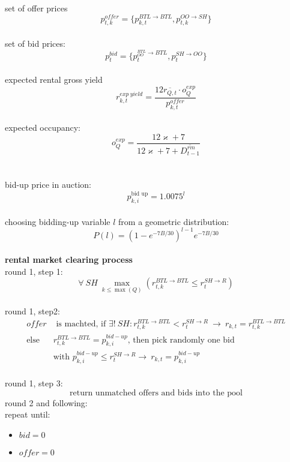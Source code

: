 \documentclass[]{article}
\begin{document}
set of offer prices
\begin{equation}\label{eq:p_offer}
	p^{offer}_{t,k} = \{p^{BTL\rightarrow BTL}_{k,t}, p^{OO\rightarrow SH}_{t,k}\}
\end{equation}
\\
set of bid prices:
\begin{equation}\label{eq:p_bid}
	p^{bid}_{t}= \{p^{^{BTL}_{OO}\rightarrow BTL}_{t}, p^{SH\rightarrow OO}_{t}\}
\end{equation}
\\
expected rental gross yield
\begin{equation}\label{eq:exp_rent_g_y}
		r^{exp\ yield}_{k,t}= \frac{12\overline{r_{Q,t}}\cdot o^{exp}_{Q}}{p^{offer}_{k,t}}
\end{equation}
\\
expected occupancy:
\begin{equation}\label{eq:exp_occ}
	o^{exp}_{Q}= \frac{ 12 \varkappa + 7 }{ 12 \varkappa + 7 + \overline{D^{rm}_{t-1}}}
\end{equation}
\\
\\
bid-up price in auction:
\begin{equation} \label{eq:bid_up_price}
p^{\text{bid up}}_{k,i}=1.0075^{l}
\end{equation}
\\
choosing bidding-up variable $l$ from a geometric distribution:
\begin{equation} \label{eq:bidding}
P(l)= (1-e^{-7B/30})^{l-1}e^{-7B/30}
\end{equation}
\\
\textbf{rental market clearing process}\\
round 1, step 1:
\begin{equation*}
\forall\  SH\ \max_{k\leq \max(Q)} \left(r^{BTL\rightarrow BTL}_{t,k}\leq r^{SH\rightarrow R}_{t}\right) 
\end{equation*}
\\
round 1, step2:
\begin{equation}\label{eq:realised_rent}
\begin{split}
offer&\text{ is machted, if } \exists!\ SH: r^{BTL\rightarrow BTL}_{t,k}<r^{SH\rightarrow R}_{t} \ \rightarrow \  r_{k,t}=r^{BTL\rightarrow BTL}_{t,k}\\
\text{else }& r^{BTL\rightarrow BTL}_{t,k}=p^{bid-up}_{k,i}\text{, then pick randomly one bid} \\
&\text{with } p^{bid-up}_{k,i} \leq  r^{SH\rightarrow R}_{t} \rightarrow \  r_{k,t}=p^{bid-up}_{k,i}
\end{split}
\end{equation}
\\
round 1, step 3:
\begin{equation*}
\text{return unmatched offers and bids into the pool}
\end{equation*}
round 2 and following:
\\
repeat until: \begin{itemize}
	\item $bid=0$
	\item $offer =0$
\end{itemize}
\end{document}
